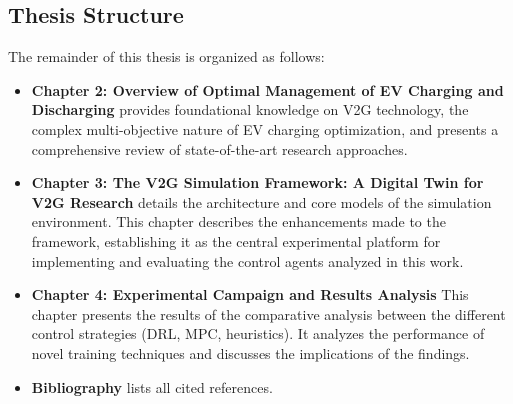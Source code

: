 \subsection{Thesis Structure}
The remainder of this thesis is organized as follows:
\begin{itemize}
    \item \textbf{Chapter 2: Overview of Optimal Management of EV Charging and Discharging} provides foundational knowledge on V2G technology, the complex multi-objective nature of EV charging optimization, and presents a comprehensive review of state-of-the-art research approaches.

    \item \textbf{Chapter 3: The V2G Simulation Framework: A Digital Twin for V2G Research} details the architecture and core models of the simulation environment. This chapter describes the enhancements made to the framework, establishing it as the central experimental platform for implementing and evaluating the control agents analyzed in this work.

    \item \textbf{Chapter 4: Experimental Campaign and Results Analysis } This chapter presents the results of the comparative analysis between the different control strategies (DRL, MPC, heuristics). It analyzes the performance of novel training techniques and discusses the implications of the findings. %

    \item \textbf{Bibliography} lists all cited references.
\end{itemize}